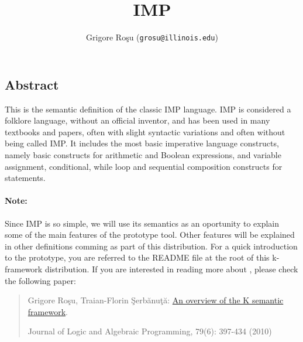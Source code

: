 \setlength{\parindent}{1em}
\title{IMP}
\author{Grigore Ro\c{s}u (\texttt{grosu@illinois.edu})}

\maketitle

\begin{latexComment}
\section{Abstract}
This is the \K semantic definition of the classic IMP language.
IMP is considered a folklore language, without an official inventor,
and has been used in many textbooks and papers, often with slight
syntactic variations and often without being called IMP.  It includes
the most basic imperative language constructs, namely basic constructs
for arithmetic and Boolean expressions, and variable assignment,
conditional, while loop and sequential composition constructs for statements.

\paragraph{Note:}{
Since IMP is so simple, we will use its semantics as an oportunity to
explain some of the main features of the \K  prototype tool.  Other
features will be explained in other \K definitions comming as part of
this distribution.  For a quick introduction to the \K prototype, you
are referred to the README file at the root of this k-framework
distribution.  If you are interested in reading more about \K, please
check the following paper:
\begin{quote}
Grigore Ro\c su, Traian-Florin \c Serb\u anu\c t\u a:
\href{http://dx.doi.org/10.1016/j.jlap.2010.03.012}{An overview of the K semantic framework}.

Journal of Logic and Algebraic Programming, 79(6): 397-434 (2010)
\end{quote}
}

\end{latexComment}

\vspace*{3ex}
